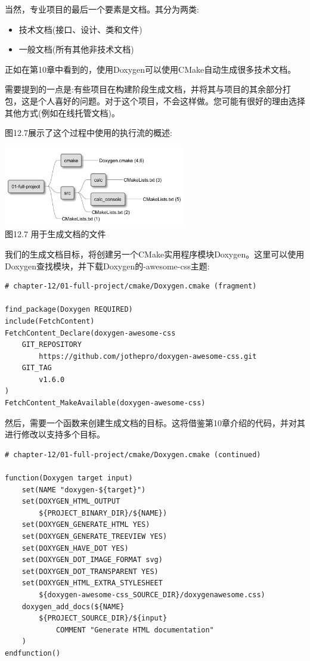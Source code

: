 
当然，专业项目的最后一个要素是文档。其分为两类:

\begin{itemize}
\item 
技术文档(接口、设计、类和文件)

\item 
一般文档(所有其他非技术文档)
\end{itemize}

正如在第10章中看到的，使用Doxygen可以使用CMake自动生成很多技术文档。


需要提到的一点是:有些项目在构建阶段生成文档，并将其与项目的其余部分打包，这是个人喜好的问题。对于这个项目，不会这样做。您可能有很好的理由选择其他方式(例如在线托管文档)。

图12.7展示了这个过程中使用的执行流的概述:

\begin{center}
\includegraphics[width=0.6\textwidth]{content/3/chapter12/images/7.jpg}\\
图12.7 用于生成文档的文件
\end{center}

我们的生成文档目标，将创建另一个CMake实用程序模块Doxygen。这里可以使用Doxygen查找模块，并下载Doxygen的-awesome-css主题:

\begin{lstlisting}[style=styleCMake]
# chapter-12/01-full-project/cmake/Doxygen.cmake (fragment)

find_package(Doxygen REQUIRED)
include(FetchContent)
FetchContent_Declare(doxygen-awesome-css
	GIT_REPOSITORY
		https://github.com/jothepro/doxygen-awesome-css.git
	GIT_TAG
		v1.6.0
)
FetchContent_MakeAvailable(doxygen-awesome-css)
\end{lstlisting}

然后，需要一个函数来创建生成文档的目标。这将借鉴第10章介绍的代码，并对其进行修改以支持多个目标。

\begin{lstlisting}[style=styleCMake]
# chapter-12/01-full-project/cmake/Doxygen.cmake (continued)

function(Doxygen target input)
	set(NAME "doxygen-${target}")
	set(DOXYGEN_HTML_OUTPUT
		${PROJECT_BINARY_DIR}/${NAME})
	set(DOXYGEN_GENERATE_HTML YES)
	set(DOXYGEN_GENERATE_TREEVIEW YES)
	set(DOXYGEN_HAVE_DOT YES)
	set(DOXYGEN_DOT_IMAGE_FORMAT svg)
	set(DOXYGEN_DOT_TRANSPARENT YES)
	set(DOXYGEN_HTML_EXTRA_STYLESHEET
		${doxygen-awesome-css_SOURCE_DIR}/doxygenawesome.css)
	doxygen_add_docs(${NAME}
		${PROJECT_SOURCE_DIR}/${input}
			COMMENT "Generate HTML documentation"
	)
endfunction()
\end{lstlisting}


